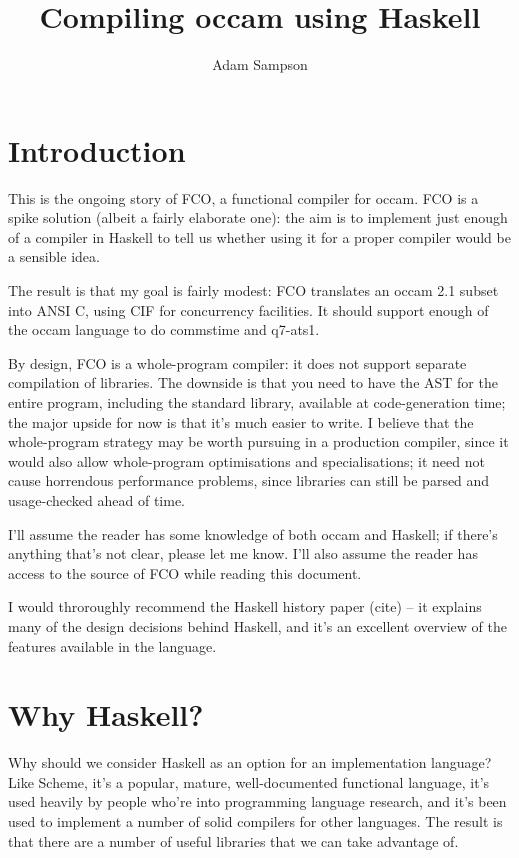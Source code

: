 \documentclass[a4paper,12pt]{article}
\def\occam{{\sffamily occam}\xspace}
\begin{document}
\title{Compiling \occam using Haskell}
\author{Adam Sampson}
\maketitle

\section{Introduction}

This is the ongoing story of FCO, a functional compiler for \occam.
FCO is a spike solution (albeit a fairly elaborate one): the aim is to
implement just enough of a compiler in Haskell to tell us whether
using it for a proper compiler would be a sensible idea.

The result is that my goal is fairly modest: FCO translates an \occam 2.1
subset into ANSI C, using CIF for concurrency facilities. It should
support enough of the \occam language to do commstime and q7-ats1.

By design, FCO is a whole-program compiler: it does not support separate
compilation of libraries. The downside is that you need to have the
AST for the entire program, including the standard library, available at
code-generation time; the major upside for now is that it's much easier
to write. I believe that the whole-program strategy may be worth
pursuing in a production compiler, since it would also allow
whole-program optimisations and specialisations; it need not cause
horrendous performance problems, since libraries can still be parsed and
usage-checked ahead of time.

I'll assume the reader has some knowledge of both \occam and Haskell; if
there's anything that's not clear, please let me know. I'll also assume
the reader has access to the source of FCO while reading this document.

I would throroughly recommend the Haskell history paper (cite) -- it
explains many of the design decisions behind Haskell, and it's an
excellent overview of the features available in the language.

\section{Why Haskell?}

Why should we consider Haskell as an option for an implementation
language? Like Scheme, it's a popular, mature, well-documented
functional language, it's used heavily by people who're into programming
language research, and it's been used to implement a number of solid
compilers for other languages. The result is that there are a number of
useful libraries that we can take advantage of.
\end{document}
